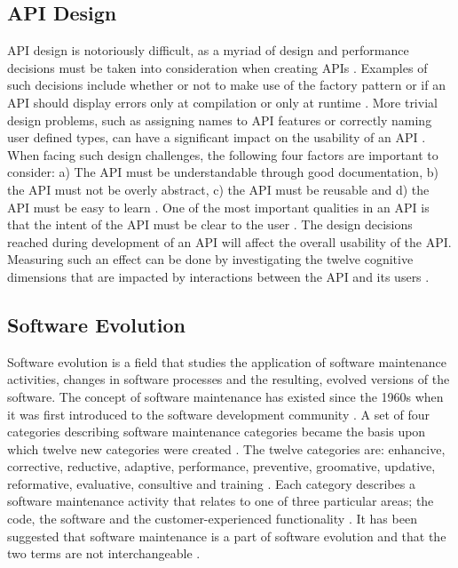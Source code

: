 \documentclass{sig-alternate}
\begin{document}
\subsection{API Design} \label{api_design}
API design is notoriously difficult, as a myriad of design and performance decisions must be taken into consideration when creating APIs \cite{afonso2012evaluating} \cite{bloch2008effective} \cite{stylos2006comparing}. Examples of such decisions include whether or not to make use of the factory pattern or if an API should display errors only at compilation or only at runtime \cite{stylos2006comparing}. More trivial design problems, such as assigning names to API features or correctly naming user defined types, can have a significant impact on the usability of an API \cite{shi2011empirical}. When facing such design challenges, the following four factors are important to consider: a) The API must be understandable through good documentation, b) the API must not be overly abstract, c) the API must be reusable and d) the API must be easy to learn \cite{shi2011empirical}. One of the most important qualities in an API is that the intent of the API must be clear to the user \cite{stylos2006comparing} \cite{shi2011empirical}. The design decisions reached during development of an API will affect the overall usability of the API. Measuring such an effect can be done by investigating the twelve cognitive dimensions that are impacted by interactions between the API and its users \cite{clarke2004measuring}. 


\subsection{Software Evolution} \label{software_evolution}
Software evolution is a field that studies the application of software maintenance activities, changes in software processes and the resulting, evolved versions of the software. The concept of software maintenance has existed since the 1960s when it was first introduced to the software development community \cite{lientz1980software}. A set of four categories describing software maintenance categories \cite{lientz1980software} became the basis upon which twelve new categories were created \cite{chapin2001types}. The twelve categories are: enhancive, corrective, reductive, adaptive, performance, preventive, groomative, updative, reformative, evaluative, consultive and training \cite{chapin2001types}. Each category describes a software maintenance activity that relates to one of three particular areas; the code, the software and the customer-experienced functionality \cite{chapin2001types}. It has been suggested that software maintenance is a part of software evolution and that the two terms are not interchangeable \cite{chapin2001types}.
\end{document}
